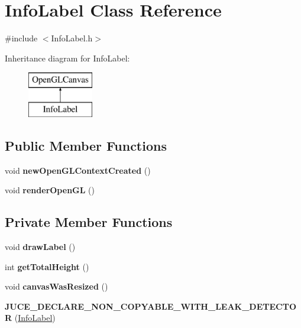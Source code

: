 \hypertarget{classInfoLabel}{\section{Info\-Label Class Reference}
\label{classInfoLabel}
}


{\ttfamily \#include $<$Info\-Label.\-h$>$}

Inheritance diagram for Info\-Label\-:\begin{figure}[H]
\begin{center}
\leavevmode
\includegraphics[height=2.000000cm]{classInfoLabel}
\end{center}
\end{figure}
\subsection*{Public Member Functions}
\begin{DoxyCompactItemize}
\item 
\hypertarget{classInfoLabel_ac7cfb1fffddb888a31e887b1ae9b89ae}{void {\bfseries new\-Open\-G\-L\-Context\-Created} ()}\label{classInfoLabel_ac7cfb1fffddb888a31e887b1ae9b89ae}

\item 
\hypertarget{classInfoLabel_a08e0dac049fd82431fbc6837f1d05347}{void {\bfseries render\-Open\-G\-L} ()}\label{classInfoLabel_a08e0dac049fd82431fbc6837f1d05347}

\end{DoxyCompactItemize}
\subsection*{Private Member Functions}
\begin{DoxyCompactItemize}
\item 
\hypertarget{classInfoLabel_a6f36d45e3b1ed07bd6e5ceb20cbcae4f}{void {\bfseries draw\-Label} ()}\label{classInfoLabel_a6f36d45e3b1ed07bd6e5ceb20cbcae4f}

\item 
\hypertarget{classInfoLabel_a6a9c140cdce03c12e09507cd6cefa628}{int {\bfseries get\-Total\-Height} ()}\label{classInfoLabel_a6a9c140cdce03c12e09507cd6cefa628}

\item 
\hypertarget{classInfoLabel_a80a01982ced2a1445e53937f8897b475}{void {\bfseries canvas\-Was\-Resized} ()}\label{classInfoLabel_a80a01982ced2a1445e53937f8897b475}

\item 
\hypertarget{classInfoLabel_ad72a0146997a1669d1af7231725629a3}{{\bfseries J\-U\-C\-E\-\_\-\-D\-E\-C\-L\-A\-R\-E\-\_\-\-N\-O\-N\-\_\-\-C\-O\-P\-Y\-A\-B\-L\-E\-\_\-\-W\-I\-T\-H\-\_\-\-L\-E\-A\-K\-\_\-\-D\-E\-T\-E\-C\-T\-O\-R} (\hyperlink{classInfoLabel}{Info\-Label})}\label{classInfoLabel_ad72a0146997a1669d1af7231725629a3}

\end{DoxyCompactItemize}
